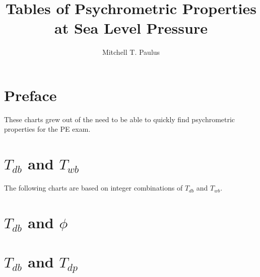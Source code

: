 \documentclass{book}
\title{Tables of Psychrometric Properties at Sea Level Pressure}
\author{Mitchell T. Paulus}
\begin{document}
\maketitle{}

\chapter{Preface}

These charts grew out of the need to be able to quickly find
psychrometric properties for the PE exam.

\chapter{\(T_{db}\) and \(T_{wb}\) }

The following charts are based on integer combinations of \(T_{db}\) and
\(T_{wb}\).

\newpage
{
\small



}

\chapter{\(T_{db}\) and \(\phi\) }


\newpage
{
\small



}


\chapter{  \(T_{db}\) and \(T_{dp}\) }

\newpage
{
\small




}






\end{document}
